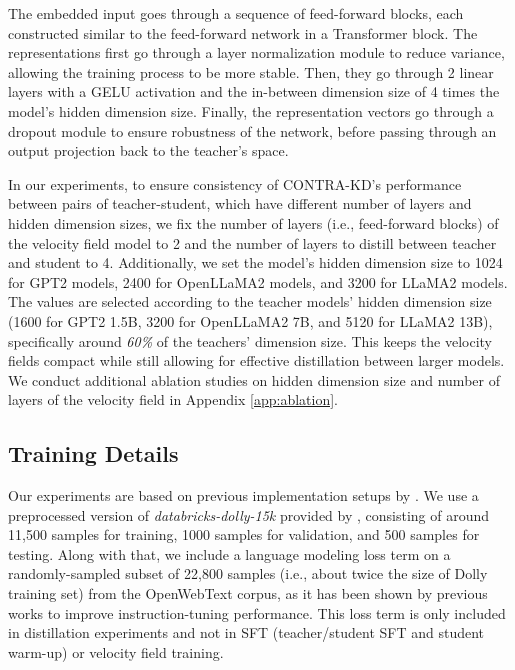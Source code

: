 \documentclass{article} %
\theoremstyle{definition}
\theoremstyle{remark}
\begin{document}
The embedded input goes through a sequence of feed-forward blocks, each constructed similar to the feed-forward network in a Transformer \cite{vaswani2023attentionneed} block. The representations first go through a layer normalization module \cite{ba2016layernormalization} to reduce variance, allowing the training process to be more stable. Then, they go through 2 linear layers with a GELU \cite{hendrycks2023gaussianerrorlinearunits} activation and the in-between dimension size of 4 times the model's hidden dimension size. Finally, the representation vectors go through a dropout module to ensure robustness of the network, before passing through an output projection back to the teacher's space.

In our experiments, to ensure consistency of CONTRA-KD's performance between pairs of teacher-student, which have different number of layers and hidden dimension sizes, we fix the number of layers (i.e., feed-forward blocks) of the velocity field model to 2 and the number of layers to distill between teacher and student to 4. Additionally, we set the model's hidden dimension size to 1024 for GPT2 models, 2400 for OpenLLaMA2 models, and 3200 for LLaMA2 models. The values are selected according to the teacher models' hidden dimension size (1600 for GPT2 1.5B, 3200 for OpenLLaMA2 7B, and 5120 for LLaMA2 13B), specifically around \textit{60\%} of the teachers' dimension size. This keeps the velocity fields compact while still allowing for effective distillation between larger models. We conduct additional ablation studies on hidden dimension size and number of layers of the velocity field in Appendix \ref{app:ablation}.

\subsection{Training Details}
Our experiments are based on previous implementation setups by \cite{gu2024minillmknowledgedistillationlarge, ko2024distillmstreamlineddistillationlarge,gong-etal-2025-beyond}. We use a preprocessed version of \textit{databricks-dolly-15k} provided by \cite{zhang2024dualspaceknowledgedistillationlarge}, consisting of around 11,500 samples for training, 1000 samples for validation, and 500 samples for testing. Along with that, we include a language modeling loss term on a randomly-sampled subset of 22,800 samples (i.e., about twice the size of Dolly training set) from the OpenWebText \cite{Gokaslan2019OpenWeb} corpus, as it has been shown by previous works to improve instruction-tuning performance. This loss term is only included in distillation experiments and not in SFT (teacher/student SFT and student warm-up) or velocity field training.
\end{document}
